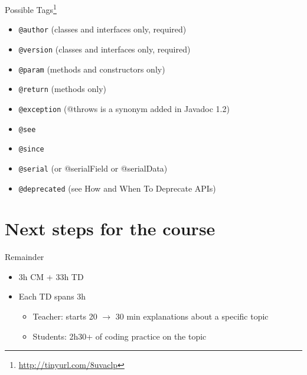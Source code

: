 \documentclass[English,c,%
hyperref={%
    pdftitle={FISA-DE2 OOP in Java},%
    pdfauthor={Muller, Gravier, Laforest, Subercaze},%
    pdfsubject={OOP in Java},%
    pdfkeywords={OOP, Java}%
    },%
xcolor={pdftex,svgnames} %
]{beamer}
\begin{document}
\begin{frame}{Possible Tags\footnote{\url{http://tinyurl.com/8uvaclp}}}
\begin{itemize}
    \item \texttt{@author} (classes and interfaces only, required)
    \item \texttt{@version} (classes and interfaces only, required)
    \item \texttt{@param} (methods and constructors only)
    \item \texttt{@return} (methods only)
    \item \texttt{@exception} (@throws is a synonym added in Javadoc 1.2)
    \item \texttt{@see}
    \item \texttt{@since}
    \item \texttt{@serial} (or @serialField or @serialData)
    \item \texttt{@deprecated} (see How and When To Deprecate APIs)
\end{itemize}
\end{frame}


\section{Next steps for the course}

\begin{frame}{Remainder}

 \begin{itemize}
  \item 3h CM + 33h TD
  \vspace{3em}
  \item Each TD spans 3h
  \begin{itemize}
    \item Teacher: starts 20 $\rightarrow$ 30 min explanations about a
    specific topic
    \item  Students: 2h30+ of coding practice on the topic
  \end{itemize}
\end{itemize}
\end{frame}
\end{document}
